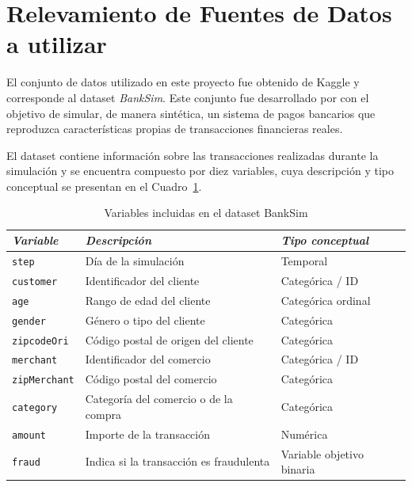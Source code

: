 
\section{Relevamiento de Fuentes de Datos a utilizar}

El conjunto de datos utilizado en este proyecto fue obtenido de Kaggle y corresponde al dataset \textit{BankSim}. Este conjunto fue desarrollado por \textcite{inproceedings} con el objetivo de simular, de manera sintética, un sistema de pagos bancarios que reproduzca características propias de transacciones financieras reales.

El dataset contiene información sobre las transacciones realizadas durante la simulación y se encuentra compuesto por diez variables, cuya descripción y tipo conceptual se presentan en el Cuadro~\ref{tab:variables_dataset}.

\begin{table}[!htbp]
    \centering
    \caption{Variables incluidas en el dataset BankSim}
    \label{tab:variables_dataset}
    \begin{tabular}{lll}
        \toprule
        \textit{Variable} & \textit{Descripción} & \textit{Tipo conceptual} \\
        \midrule
        \texttt{step}        & Día de la simulación                    & Temporal \\
        \texttt{customer}    & Identificador del cliente               & Categórica / ID \\
        \texttt{age}         & Rango de edad del cliente               & Categórica ordinal \\
        \texttt{gender}      & Género o tipo del cliente               & Categórica \\
        \texttt{zipcodeOri}  & Código postal de origen del cliente     & Categórica \\
        \texttt{merchant}    & Identificador del comercio              & Categórica / ID \\
        \texttt{zipMerchant} & Código postal del comercio              & Categórica \\
        \texttt{category}    & Categoría del comercio o de la compra   & Categórica \\
        \texttt{amount}      & Importe de la transacción               & Numérica \\
        \texttt{fraud}       & Indica si la transacción es fraudulenta & Variable objetivo binaria \\
        \bottomrule
    \end{tabular}
\end{table}

